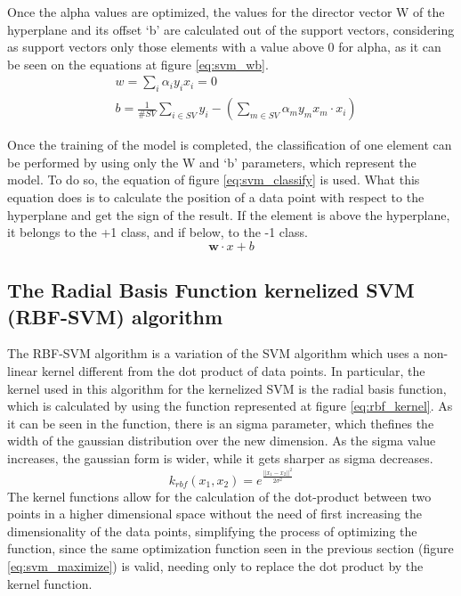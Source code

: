 \documentclass[10pt, journal]{IEEEtran}
\begin{document}
Once the alpha values are optimized, the values for the director vector W of the hyperplane and its offset `b' are calculated out of the support vectors, considering as support vectors only those elements with a value above 0 for alpha, as it can be seen on the equations at figure \ref{eq:svm_wb}.\\
\begin{equation}
	\begin{aligned}
		&w = \sum_i{\alpha_iy_ix_i} = 0\\
		&b = \frac{1}{\#SV}\sum_{i \in SV}{y_i-(\sum_{m \in SV}{\alpha_my_mx_m\cdot x_i})}
	\end{aligned}
	\label{eq:svm_wb}
\end{equation}

Once the training of the model is completed, the classification of one element can be performed by using only the W and `b' parameters, which represent the model. To do so, the equation of figure \ref{eq:svm_classify} is used. What this equation does is to calculate the position of a data point with respect to the hyperplane and get the sign of the result. If the element is above the hyperplane, it belongs to the +1 class, and if below, to the -1 class.
\begin{equation}
	\mathbf{w}\cdot x + b
	\label{eq:svm_classify}
\end{equation}

\subsection{The Radial Basis Function kernelized SVM (RBF-SVM) algorithm} %
\label{sub:the_radial_basis_function_kernelized_svm_rbf_svm_algorithm}

The RBF-SVM algorithm is a variation of the SVM algorithm which uses a non-linear kernel different from the dot product of data points. In particular, the kernel used in this algorithm for the kernelized SVM is the radial basis function, which is calculated by using the function represented at figure \ref{eq:rbf_kernel}. As it can be seen in the function, there is an sigma parameter, which thefines the width of the gaussian distribution over the new dimension. As the sigma value increases, the gaussian form is wider, while it gets sharper as sigma decreases.\\
\begin{equation}
	k_{rbf}(x_1,x_2) = e^\frac{||x_1-x_2||^2}{2\sigma^2}
	\label{eq:rbf_kernel}
\end{equation}
The kernel functions allow for the calculation of the dot-product between two points in a higher dimensional space without the need of first increasing the dimensionality of the data points, simplifying the process of optimizing the function, since the same optimization function seen in the previous section (figure \ref{eq:svm_maximize}) is valid, needing only to replace the dot product by the kernel function.\\
\end{document}

